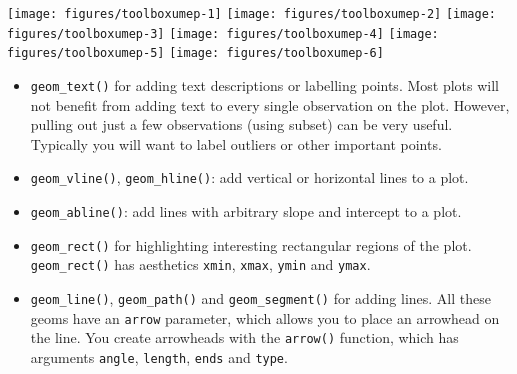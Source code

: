 \begin{Shaded}
\begin{Highlighting}[]
\StringTok{ }\StringTok{ }
\StringTok{ }\NormalTok{(} 
                    \NormalTok{, } \NormalTok{, } \NormalTok{)}
\end{Highlighting}
\end{Shaded}

\texttt{[image: figures/toolboxumep-1]}
\texttt{[image: figures/toolboxumep-2]}
\texttt{[image: figures/toolboxumep-3]}
\texttt{[image: figures/toolboxumep-4]}
\texttt{[image: figures/toolboxumep-5]}
\texttt{[image: figures/toolboxumep-6]}

\begin{itemize}
\itemsep1pt\parskip0pt
\item
  \texttt{geom\_text()} for adding text descriptions or labelling
  points. Most plots will not benefit from adding text to every single
  observation on the plot. However, pulling out just a few observations
  (using subset) can be very useful. Typically you will want to label
  outliers or other important points. 
\item
  \texttt{geom\_vline()}, \texttt{geom\_hline()}: add vertical or
  horizontal lines to a plot.  
\item
  \texttt{geom\_abline()}: add lines with arbitrary slope and intercept
  to a plot. 
\item
  \texttt{geom\_rect()} for highlighting interesting rectangular regions
  of the plot. \texttt{geom\_rect()} has aesthetics \texttt{xmin},
  \texttt{xmax}, \texttt{ymin} and \texttt{ymax}. 
\item
  \texttt{geom\_line()}, \texttt{geom\_path()} and
  \texttt{geom\_segment()} for adding lines. All these geoms have an
  \texttt{arrow} parameter, which allows you to place an arrowhead on
  the line. You create arrowheads with the \texttt{arrow()} function,
  which has arguments \texttt{angle}, \texttt{length}, \texttt{ends} and
  \texttt{type}. 
\end{itemize}


